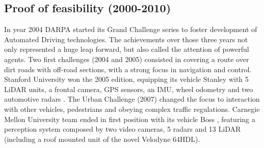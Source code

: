 \documentclass[journal]{IEEEtran}
\begin{document}
\subsection{Proof of feasibility (2000-2010)}

In year 2004 DARPA started its Grand Challenge series to foster development of
Automated Driving technologies. The achievements over those three years 
not only represented a huge leap forward, but also called the attention of
powerful agents.
Two first challenges (2004 and 2005) consisted in covering a route over dirt
roads with off-road sections, with a strong focus in navigation and control.
Stanford University won the 2005 edition, equipping its vehicle Stanley with
5 LiDAR units, a frontal camera, GPS sensors, an IMU, wheel odometry and two 
automotive radars \cite{Thrun2006}. 
The Urban Challenge (2007) changed the focus to interaction with other vehicles,
pedestrians and obeying complex traffic regulations. Carnegie Mellon University
team ended in first position with its vehicle Boss 
\cite{TartanRacing2005, Urmson2007}, 
featuring a perception system composed by two video cameras, 5 radars and 13
LiDAR (including a roof mounted unit of the novel Velodyne 64HDL).


%
\end{document}
